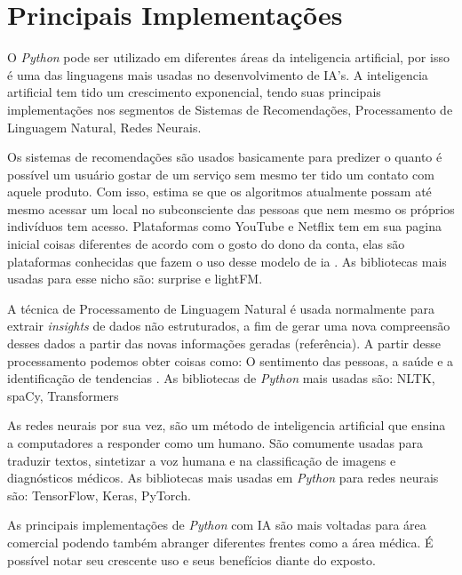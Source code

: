 \section{Principais Implementações}

O \textit{Python} pode ser utilizado em diferentes áreas da inteligencia artificial, por isso é uma das linguagens mais usadas no desenvolvimento de IA’s. A inteligencia artificial tem tido um crescimento exponencial, tendo suas principais implementações nos segmentos de Sistemas de Recomendações, Processamento de Linguagem Natural, Redes Neurais.

Os sistemas de recomendações são usados basicamente para predizer o quanto é possível um usuário gostar de um serviço sem mesmo ter tido um contato com aquele produto. Com isso, estima se que os algoritmos atualmente possam até mesmo acessar um local no subconsciente das pessoas que nem mesmo os próprios indivíduos tem acesso. Plataformas como YouTube e Netflix tem em sua pagina inicial coisas diferentes de acordo com o gosto do dono da conta, elas são plataformas conhecidas que fazem o uso desse modelo de ia \cite{didatica2024}. As bibliotecas mais usadas para esse nicho são: surprise e lightFM.

A técnica de Processamento de Linguagem Natural é usada normalmente para extrair \textit{insights} de dados não estruturados, a fim de gerar uma nova compreensão desses dados a partir das novas informações geradas (referência). A partir desse processamento podemos obter coisas como: O sentimento das pessoas, a saúde e a identificação de tendencias \cite{google2024}. As bibliotecas de \textit{Python} mais usadas são: NLTK, spaCy, Transformers

As redes neurais por sua vez, são um método de inteligencia artificial que ensina a computadores a responder como um humano. \cite{aws2024} São comumente usadas para traduzir textos, sintetizar a voz humana e na classificação de imagens e diagnósticos médicos. As bibliotecas mais usadas em \textit{Python} para redes neurais são: TensorFlow, Keras, PyTorch.

As principais implementações de \textit{Python} com IA são mais voltadas para área comercial podendo também abranger diferentes frentes como a área médica. É possível notar seu crescente uso e seus benefícios diante do exposto.